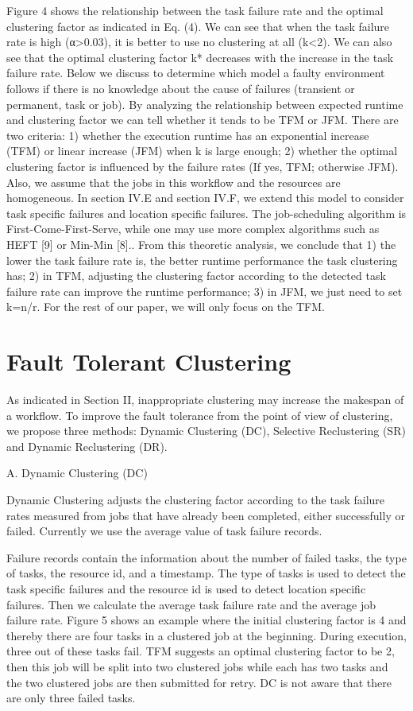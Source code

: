 \documentclass{IOS-Book-Article}
\begin{document}
Figure 4 shows the relationship between the task failure rate and the optimal clustering factor as indicated in Eq. (4). We can see that when the task failure rate is high (α>0.03), it is better to use no clustering at all (k<2).  We can also see that the optimal clustering factor k* decreases with the increase in the task failure rate. 
Below we discuss to determine which model a faulty environment follows if there is no knowledge about the cause of failures (transient or permanent, task or job). By analyzing the relationship between expected runtime and clustering factor we can tell whether it tends to be TFM or JFM.  There are two criteria: 1) whether the execution runtime has an exponential increase (TFM) or linear increase (JFM) when k is large enough; 2) whether the optimal clustering factor is influenced by the failure rates (If yes, TFM; otherwise JFM).
Also, we assume that the jobs in this workflow and the resources are homogeneous. In section IV.E and section IV.F, we extend this model to consider task specific failures and location specific failures. The job-scheduling algorithm is First-Come-First-Serve, while one may use more complex algorithms such as HEFT [9] or Min-Min [8].. 
From this theoretic analysis, we conclude that 1) the lower the task failure rate is, the better runtime performance the task clustering has; 2) in TFM, adjusting the clustering factor according to the detected task failure rate can improve the runtime performance; 3) in JFM, we just need to set k=n/r. For the rest of our paper, we will only focus on the TFM.


\section{Fault Tolerant Clustering}

As indicated in Section II, inappropriate clustering may increase the makespan of a workflow. To improve the fault tolerance from the point of view of clustering, we propose three methods: Dynamic Clustering (DC), Selective Reclustering (SR) and Dynamic Reclustering (DR).

A.	Dynamic Clustering (DC)

Dynamic Clustering adjusts the clustering factor according to the task failure rates measured from jobs that have already been completed, either successfully or failed. Currently we use the average value of task failure records. 
 
Failure records contain the information about the number of failed tasks, the type of tasks, the resource id, and a timestamp. The type of tasks is used to detect the task specific failures and the resource id is used to detect location specific failures. Then we calculate the average task failure rate and the average job failure rate. Figure 5 shows an example where the initial clustering factor is 4 and thereby there are four tasks in a clustered job at the beginning. During execution, three out of these tasks fail. TFM suggests an optimal clustering factor to be 2, then this job will be split into two clustered jobs while each has two tasks and the two clustered jobs are then submitted for retry.  DC is not aware that there are only three failed tasks. 
\end{document}
